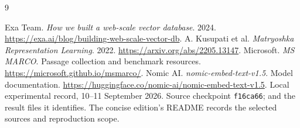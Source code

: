 \begin{thebibliography}{9}\small\raggedright
{} Exa Team. \emph{How we built a web-scale vector database}. 2024.
\url{https://exa.ai/blog/building-web-scale-vector-db}.
 A. Kusupati et al. \emph{Matryoshka Representation Learning}. 2022.
\url{https://arxiv.org/abs/2205.13147}.
 Microsoft. \emph{MS MARCO}. Passage collection and benchmark resources.
\url{https://microsoft.github.io/msmarco/}.
 Nomic AI. \emph{nomic-embed-text-v1.5}. Model documentation.
\url{https://huggingface.co/nomic-ai/nomic-embed-text-v1.5}.
 Local experimental record, 10--11 September 2026. Source checkpoint
\texttt{f16ca66};  and the result files it identifies.
The concise edition's README records the selected sources and reproduction scope.
\end{thebibliography}

